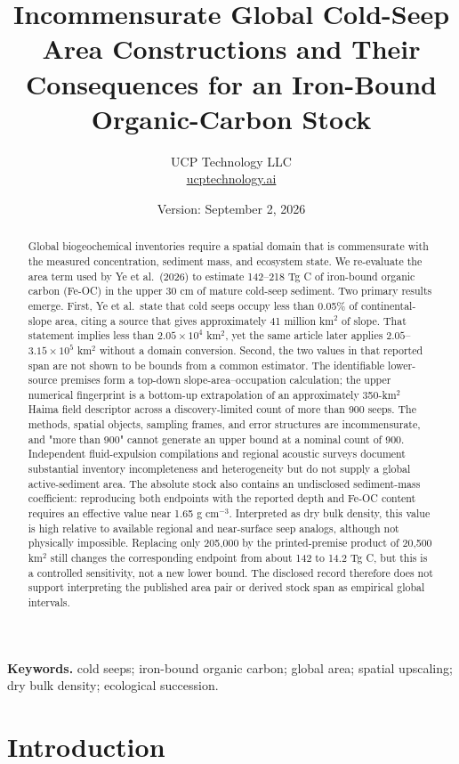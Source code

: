 \documentclass[11pt,letterpaper]{article}
\title{\bfseries Incommensurate Global Cold-Seep Area Constructions and Their Consequences for an Iron-Bound Organic-Carbon Stock}
\author{UCP Technology LLC\\[3pt]
  \small\href{https://ucptechnology.ai}{ucptechnology.ai}}
\date{\small Version: September 2, 2026}
\begin{document}
\maketitle

\begin{abstract}
Global biogeochemical inventories require a spatial domain that is commensurate with the measured concentration, sediment mass, and ecosystem state. We re-evaluate the area term used by Ye et al.\ (2026) to estimate 142--218 Tg C of iron-bound organic carbon (Fe-OC) in the upper 30 cm of mature cold-seep sediment. Two primary results emerge. First, Ye et al.\ state that cold seeps occupy less than 0.05\% of continental-slope area, citing a source that gives approximately 41 million km$^2$ of slope. That statement implies less than $2.05\times10^4$ km$^2$, yet the same article later applies $2.05$--$3.15\times10^5$ km$^2$ without a domain conversion. Second, the two values in that reported span are not shown to be bounds from a common estimator. The identifiable lower-source premises form a top-down slope-area--occupation calculation; the upper numerical fingerprint is a bottom-up extrapolation of an approximately 350-km$^2$ Haima field descriptor across a discovery-limited count of more than 900 seeps. The methods, spatial objects, sampling frames, and error structures are incommensurate, and "more than 900" cannot generate an upper bound at a nominal count of 900. Independent fluid-expulsion compilations and regional acoustic surveys document substantial inventory incompleteness and heterogeneity but do not supply a global active-sediment area. The absolute stock also contains an undisclosed sediment-mass coefficient: reproducing both endpoints with the reported depth and Fe-OC content requires an effective value near 1.65 g cm$^{-3}$. Interpreted as dry bulk density, this value is high relative to available regional and near-surface seep analogs, although not physically impossible. Replacing only 205,000 by the printed-premise product of 20,500 km$^2$ still changes the corresponding endpoint from about 142 to 14.2 Tg C, but this is a controlled sensitivity, not a new lower bound. The disclosed record therefore does not support interpreting the published area pair or derived stock span as empirical global intervals.
\end{abstract}

\noindent\textbf{Keywords.}
cold seeps; iron-bound organic carbon; global area; spatial upscaling;
dry bulk density; ecological succession.

\section{Introduction}
\end{document}
